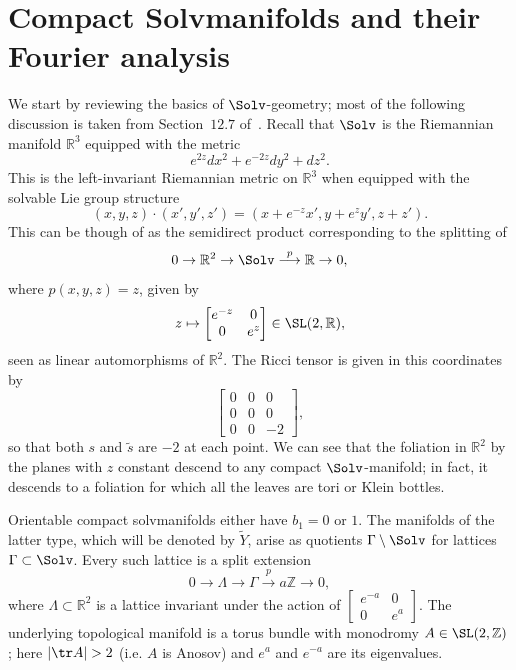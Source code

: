 \section{Compact Solvmanifolds and their Fourier analysis}\label{fourier}

We start by reviewing the basics of $\Solv$-geometry; most of the following discussion is taken from Section~$12.7$ of~\cite{Mar}. Recall that $\Solv$ is the Riemannian manifold $\mathbb{R}^3$ equipped with the metric
\[
e^{2z}dx^2+e^{-2z}dy^2+dz^2.
\]
This is the left-invariant Riemannian metric on $\mathbb{R}^3$ when equipped with the solvable Lie group structure
\[
(x,y,z)\cdot(x',y',z')=(x+e^{-z}x', y+e^{z}y', z+z').
\]
This can be though of as the semidirect product corresponding to the splitting of
\[
0\rightarrow \mathbb{R}^2\rightarrow \Solv\stackrel{p}{\longrightarrow} \mathbb{R}\rightarrow 0,
\]
where $p(x,y,z)=z$, given by
\[
z\mapsto
\begin{bmatrix}e^{-z}&0\\0 &e^{z}
\end{bmatrix}\in\SL(2,\mathbb{R}),
\]
seen as linear automorphisms of $\mathbb{R}^2$. The Ricci tensor is given in this coordinates by
\[
\begin{bmatrix}0&0&0\\0 &0&0\\ 0&0&-2
\end{bmatrix},
\]
so that both $s$ and $\tilde{s}$ are $-2$ at each point. We can see that the foliation in $\mathbb{R}^2$ by the planes with $z$ constant descend to any compact $\Solv$-manifold; in fact, it descends to a foliation for which all the leaves are tori or Klein bottles.


Orientable compact solvmanifolds either have $b_1=0$ or $1$. The manifolds of the latter type, which will be denoted by $\tilde{Y}$, arise as quotients $\Gamma\setminus\Solv$ for lattices $\Gamma\subset \Solv$. Every such lattice is a split extension
\[
0\rightarrow \Lambda\rightarrow \Gamma\stackrel{p}{\longrightarrow} a\mathbb{Z}\rightarrow 0,
\]
where $\Lambda\subset \mathbb{R}^2$ is a lattice invariant under the action of $
\begin{bmatrix}e^{-a}&0\\0 &e^{a}
\end{bmatrix}$. The underlying topological manifold is a torus bundle with monodromy $A\in \SL(2,\mathbb{Z})$; here $|\tr A|>2$ (i.e. $A$ is Anosov) and $e^a$ and $e^{-a}$ are its eigenvalues.

